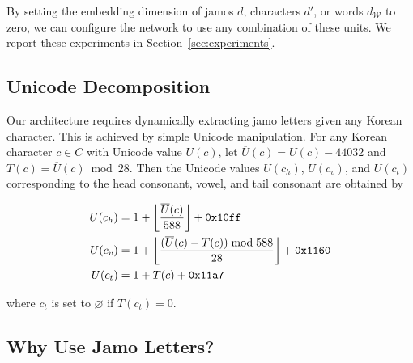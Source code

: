 \documentclass[11pt,letterpaper]{article}
\DeclarePairedDelimiter\floor{\lfloor}{\rfloor}
\begin{document}
\begin{CJK}{UTF8}{gbsn}
By setting the embedding dimension of jamos $d$, characters $d'$, or words $d_{\mathcal{W}}$ to zero,
we can configure the network to use any combination of these units.
We report these experiments in Section~\ref{sec:experiments}.

\subsection{Unicode Decomposition}
\label{subsec:unicode}

Our architecture requires dynamically extracting jamo letters given any Korean character.
This is achieved by simple Unicode manipulation.
For any Korean character $c \in C$ with Unicode value $U(c)$,
let $\overline{U}(c) = U(c) - 44032$ and $T(c) = \overline{U}(c) \bmod 28$.
Then the Unicode values $U(c_h)$, $U(c_v)$, and $U(c_t)$ corresponding to the head consonant, vowel, and tail consonant are obtained by

\vspace{-3mm}
{\small
\begin{align*}
U(c_h) &= 1 + \floor*{\frac{\overline{U}(c)}{588}} + \texttt{0x10ff} \\
U(c_v) &= 1 + \floor*{\frac{(\overline{U}(c) - T(c)) \bmod 588}{28}} + \texttt{0x1160}\\
U(c_t) &= 1 + T(c) + \texttt{0x11a7}
\end{align*}
}
\vspace{-3mm}

\noindent
where $c_t$ is set to $\mbox{$\varnothing$}$ if $T(c_t) = 0$.

\subsection{Why Use Jamo Letters?}


\end{CJK}
\end{document}
